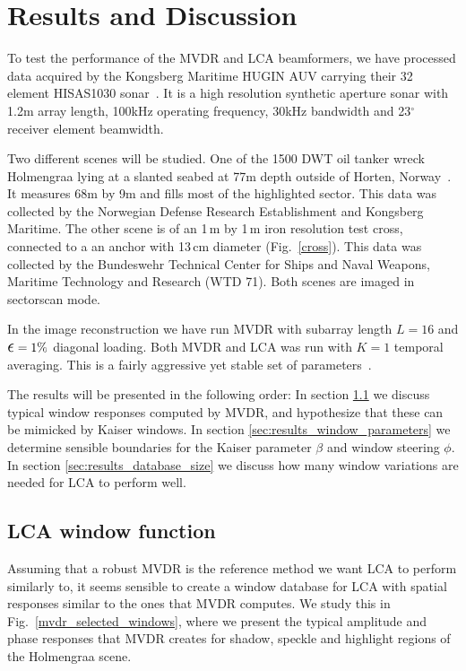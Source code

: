 \documentclass[10pt,journal,draftclsnofoot,onecolumn]{IEEEtran}
\newcommand\Fig[1]{Fig.~\ref{#1}}
\newcommand\1{\vec 1}
\begin{document}
\section{Results and Discussion}\label{sec:results_discussion}

To test the performance of the MVDR and LCA beamformers, we have processed data acquired by the Kongsberg Maritime HUGIN AUV carrying their 32 element HISAS1030 sonar~\cite{Hansen2011}. It is a high resolution synthetic aperture sonar with 1.2\;m array length, 100\;kHz operating frequency, 30\;kHz bandwidth and 23$^\circ$ receiver element beamwidth.

Two different scenes will be studied. One of the 1500 DWT oil tanker wreck Holmengraa lying at a slanted seabed at 77\;m depth outside of Horten, Norway~\cite{holmengraa}. It measures 68\;m by 9\;m and fills most of the highlighted sector. This data was collected by the Norwegian Defense Research Establishment and Kongsberg Maritime. The other scene is of an 1\,m by 1\,m iron resolution test cross, connected to a an anchor with 13\,cm diameter (\Fig{cross}). This data was collected by the Bundeswehr Technical Center for Ships and Naval Weapons, Maritime Technology and Research (WTD 71). Both scenes are imaged in sectorscan mode.

In the image reconstruction we have run MVDR with subarray length $L=16$ and $\text{\large$\epsilon$}=1\%$ diagonal loading. Both MVDR and LCA was run with $K=1$ temporal averaging. This is a fairly aggressive yet stable set of parameters~\cite{Synnevag2009a}.

The results will be presented in the following order: In section \ref{sec:results_lca_window_function} we discuss typical window responses computed by MVDR, and hypothesize that these can be mimicked by Kaiser windows. In section \ref{sec:results_window_parameters} we determine sensible boundaries for the Kaiser parameter $\beta$ and window steering $\phi$. In section \ref{sec:results_database_size} we discuss how many window variations are needed for LCA to perform well. 

\subsection{LCA window function}\label{sec:results_lca_window_function}

Assuming that a robust MVDR is the reference method we want LCA to perform similarly to, it seems sensible to create a window database for LCA with spatial responses similar to the ones that MVDR computes. We study this in \Fig{mvdr_selected_windows}, where we present the typical amplitude and phase responses that MVDR creates for shadow, speckle and highlight regions of the Holmengraa scene.
\end{document}
